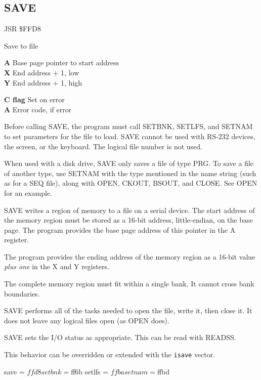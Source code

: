 
\newpage
\subsection{SAVE}
\label{KERNAL Jump Table!SAVE}
\begin{description}[leftmargin=2cm,style=nextline]
    \item [Address:] JSR \$FFD8
    \item [Description:] Save to file
    \item [Inputs:]
        \textbf{A} Base page pointer to start address \\
        \textbf{X} End address + 1, low \\
        \textbf{Y} End address + 1, high
    \item [Outputs:]
        \textbf{C flag} Set on error \\
        \textbf{A} Error code, if error
    \item [Remarks:]
        Before calling SAVE, the program must call SETBNK, SETLFS, and SETNAM to set parameters for the file to load. SAVE cannot be used with RS-232 devices, the screen, or the keyboard. The logical file number is not used.

        When used with a disk drive, SAVE only saves a file of type PRG. To save a file of another type, use SETNAM with the type mentioned in the name string (such as  for a SEQ file), along with OPEN, CKOUT, BSOUT, and CLOSE. See OPEN for an example.

        SAVE writes a region of memory to a file on a serial device. The start address of the memory region must be stored as a 16-bit address, little-endian, on the base page. The program provides the base page address of this pointer in the A register.

        The program provides the ending address of the memory region as a 16-bit value \emph{plus one} in the X and Y registers.

        The complete memory region must fit within a single bank. It cannot cross bank boundaries.

        SAVE performs all of the tasks needed to open the file, write it, then close it. It does not leave any logical files open (as OPEN does).

        SAVE sets the I/O status as appropriate. This can be read with READSS.

        This behavior can be overridden or extended with the \texttt{isave} vector.
    \item [Example:]
        \begin{asmcode}
save = $ffd8
setbnk = $ff6b
setlfs = $ffba
setnam = $ffbd


\end{asmcode}
\end{description}
